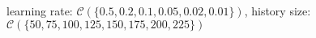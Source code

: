learning rate: $\mathcal{C}(\{\num[scientific-notation=true]{0.5},\num[scientific-notation=true]{0.2},\num[scientific-notation=true]{0.1},\num[scientific-notation=true]{0.05},\num[scientific-notation=true]{0.02},\num[scientific-notation=true]{0.01}\})$, history size: $\mathcal{C}(\{50,75,100,125,150,175,200,225\})$